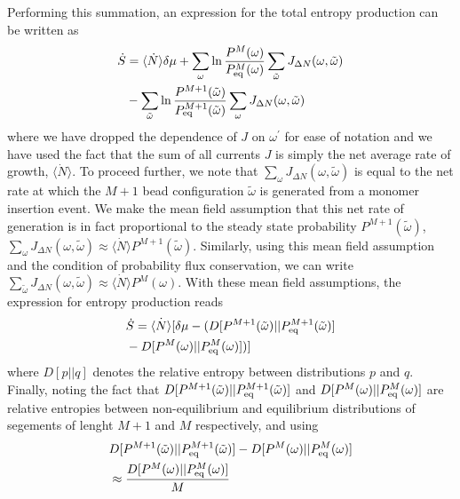 \documentclass[amsmath,preprintnumbers,10pt,nofootinbib,prl,twocolumn]{revtex4-1}
\begin{document}
Performing this summation, an expression for the total entropy production can be written as 
\begin{equation}
\begin{split}
    \dot{S}&=\langle \dot{N} \rangle \delta \mu+\sum_{\omega} \ln\frac{P^M(\omega)}{P_{\rm eq}^M(\omega)}\sum_{\tilde\omega} J_{\Delta N}(\omega,\tilde\omega)\\&-\sum_{\tilde\omega} \ln\frac{P^{M+1}(\tilde\omega)}{P_{\rm eq}^{M+1}(\tilde \omega)}\sum_{\omega} J_{\Delta N}(\omega,\tilde\omega)
\end{split}
\end{equation}
where we have dropped the dependence of $J$ on $\omega^\prime$ for ease of notation and we have used the fact that the sum of all currents $J$ is simply the net average rate of growth, $\langle \dot{N}\rangle$.  
To proceed further, we note that $\sum_{\omega} J_{\Delta N}(\omega,\tilde\omega)$ is equal to the net rate at which the $M+1$ bead configuration $\tilde\omega$ is generated from a monomer insertion event. We make the mean field assumption that this net rate of generation is in fact proportional to the steady state probability $P^{M+1}(\tilde \omega)$, $\sum_{\omega} J_{\Delta N}(\omega,\tilde\omega)\approx \langle \dot{N}\rangle P^{M+1}(\tilde \omega)$. Similarly, using this mean field assumption and the condition of probability flux conservation, we can write $\sum_{\tilde\omega} J_{\Delta N}(\omega,\tilde\omega)\approx \langle \dot{N}\rangle P^M(\omega)$. With these mean field assumptions, the expression for entropy production reads 
\begin{equation}
\label{eq:entprod3}
\begin{split}
    &\dot{S}=\dot{\langle N\rangle}\lbrack\delta\mu -(D[P^{M+1}(\tilde \omega)|| P_{\rm eq}^{M+1}(\tilde \omega)]\\
    &-D[P^{M}(\omega)|| P_{\rm eq}^{M}(\omega)])\rbrack
\end{split}
\end{equation}
where $D[p||q]$ denotes the relative entropy between distributions $p$ and $q$. Finally, noting the fact that $D[P^{M+1}(\tilde \omega)|| P_{\rm eq}^{M+1}(\tilde \omega)]$ and $D[P^{M}(\omega)|| P_{\rm eq}^{M}(\omega)]$ are relative entropies between non-equilibrium and equilibrium distributions of segements of lenght $M+1$ and $M$ respectively, and using 
\begin{equation}
\begin{split}
    &D[P^{M+1}(\tilde \omega)|| P_{\rm eq}^{M+1}(\tilde \omega)]-D[P^{M}(\omega)|| P_{\rm eq}^{M}(\omega)]\\&\approx \frac{D[P^{M}(\omega)|| P_{\rm eq}^{M}(\omega)]}{M}
\end{split}
\end{equation}
\end{document}

